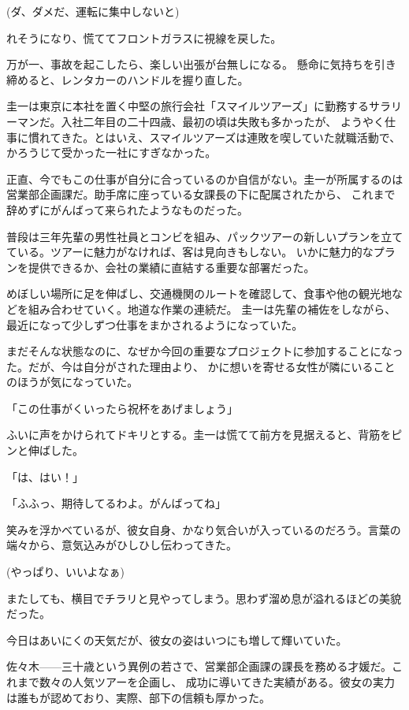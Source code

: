﻿\documentclass[book,tate]{jlreq}
\begin{document}
(ダ、ダメだ、運転に集中しないと)

れそうになり、慌ててフロントガラスに視線を戻した。

万が一、事故を起こしたら、楽しい出張が台無しになる。 懸命に気持ちを引き締めると、レンタカーのハンドルを握り直した。

圭一は東京に本社を置く中堅の旅行会社「スマイルツアーズ」に勤務するサラリーマンだ。入社二年目の二十四歳、最初の頃は失敗も多かったが、
ようやく仕事に慣れてきた。とはいえ、スマイルツアーズは連敗を喫していた就職活動で、かろうじて受かった一社にすぎなかった。

正直、今でもこの仕事が自分に合っているのか自信がない。圭一が所属するのは営業部企画課だ。助手席に座っている女課長の下に配属されたから、
これまで辞めずにがんばって来られたようなものだった。

普段は三年先輩の男性社員とコンビを組み、パックツアーの新しいプランを立てている。ツアーに魅力がなければ、客は見向きもしない。
いかに魅力的なプランを提供できるか、会社の業績に直結する重要な部署だった。

めぼしい場所に足を伸ばし、交通機関のルートを確認して、食事や他の観光地などを組み合わせていく。地道な作業の連続だ。
圭一は先輩の補佐をしながら、最近になって少しずつ仕事をまかされるようになっていた。

まだそんな状態なのに、なぜか今回の重要なプロジェクトに参加することになった。だが、今は自分がされた理由より、
かに想いを寄せる女性が隣にいることのほうが気になっていた。

「この仕事がくいったら祝杯をあげましょう」

ふいに声をかけられてドキリとする。圭一は慌てて前方を見据えると、背筋をピンと伸ばした。

「は、はい！」

「ふふっ、期待してるわよ。がんばってね」

笑みを浮かべているが、彼女自身、かなり気合いが入っているのだろう。言葉の端々から、意気込みがひしひし伝わってきた。

(やっぱり、いいよなぁ)

またしても、横目でチラリと見やってしまう。思わず溜め息が溢れるほどの美貌だった。

今日はあいにくの天気だが、彼女の姿はいつにも増して輝いていた。

佐々木------三十歳という異例の若さで、営業部企画課の課長を務める才媛だ。これまで数々の人気ツアーを企画し、
成功に導いてきた実績がある。彼女の実力は誰もが認めており、実際、部下の信頼も厚かった。
\end{document}
